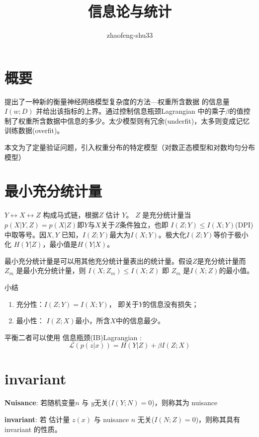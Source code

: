 \documentclass{article}
\theoremstyle{definition}
\begin{document}
\title{信息论与统计}
\author{zhaofeng-shu33}
\maketitle
\section{概要}
提出了一种新的衡量神经网络模型复杂度的方法---权重所含数据 的信息量$I(w;D)$ 并给出该指标的上界。通过控制信息瓶颈Lagrangian 中的乘子$\beta$的值控制了权重所含数据中信息的多少。太少模型则有冗余(underfit)，太多则变成记忆训练数据(overfit)。

本文为了定量验证问题，引入权重分布的特定模型（对数正态模型和对数均匀分布模型）
\section{最小充分统计量}
$ Y \leftrightarrow X \leftrightarrow Z$ 构成马式链，根据$Z$ 估计 $Y$。 $Z$ 是充分统计量当$ p( X | Y,Z)=p(X|Z)$即$Y$与$X$关于$Z$条件独立，也即 $ I(Z; Y) \leq I(X; Y) $(DPI) 中取等号。因$X, Y$ 已知，$I(Z;Y)$最大为$I(X;Y)$。极大化$I(Z;Y)$等价于极小化
$H(Y|Z)$，最小值是$H(Y|X)$。

最小充分统计量是可以用其他充分统计量表出的统计量。假设$Z$是充分统计量而$Z_m$ 是最小充分统计量，则
$I(X;Z_m) \leq I(X; Z) $ 即 $Z_m$ 是$I(X;Z)$的最小值。

小结
\begin{enumerate}
\item 充分性：$I(Z; Y) = I(X; Y) $， 即关于$Y$的信息没有损失；
\item 最小性： $I(Z;X)$最小，所含$X$中的信息最少。
\end{enumerate}

平衡二者可以使用 信息瓶颈(IB)Lagrangian :
\begin{equation}
\mathcal{L}(p(z | x) )  = H(Y|Z) + \beta I(Z;X)
\end{equation}
\section{invariant}
\textbf{Nuisance}: 若随机变量$n$ 与 $y$无关($I(Y; N) = 0$)，则称其为 nuisance

\textbf{invariant}: 若 估计量 $z(x)$ 与 nuisance $n$ 无关($I(N;Z) = 0$)，则称其具有 invariant 的性质。
\end{document}
